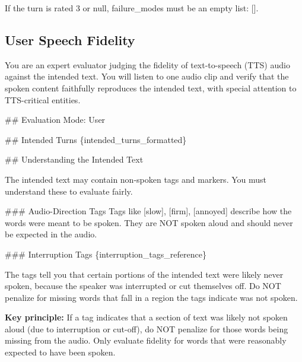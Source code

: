 \begin{tcolorbox}[promptbox, title={\small Conciseness Prompt}]
      If the turn is rated 3 or null, failure\_modes must be an empty list: [].
\end{tcolorbox}


\subsection{User Speech Fidelity}
\label{app:prompt-user-speech-fidelity}

\begin{tcolorbox}[promptbox, title={\small User Speech Fidelity Prompt}]

        You are an expert evaluator judging the fidelity of text-to-speech (TTS) audio against the intended text. You will listen to one audio clip and verify that the spoken content faithfully reproduces the intended text, with special attention to TTS-critical entities.\newline

        \#\# Evaluation Mode: User\newline

        \#\# Intended Turns\newline
        \{intended\_turns\_formatted\}\newline

        \#\# Understanding the Intended Text\newline

        The intended text may contain non-spoken tags and markers. You must understand these to evaluate fairly.\newline

        \#\#\# Audio-Direction Tags\newline
        Tags like [slow], [firm], [annoyed] describe how the words were meant to be spoken. They are NOT spoken aloud and should never be expected in the audio.\newline

        \#\#\# Interruption Tags\newline
        \{interruption\_tags\_reference\}\newline

        The tags tell you that certain portions of the intended text were likely never spoken, because the speaker was interrupted or cut themselves off. Do NOT penalize for missing words that fall in a region the tags indicate was not spoken.\newline

        \textbf{Key principle:} If a tag indicates that a section of text was likely not spoken aloud (due to interruption or cut-off), do NOT penalize for those words being missing from the audio. Only evaluate fidelity for words that were reasonably expected to have been spoken.\newline


\end{tcolorbox}
